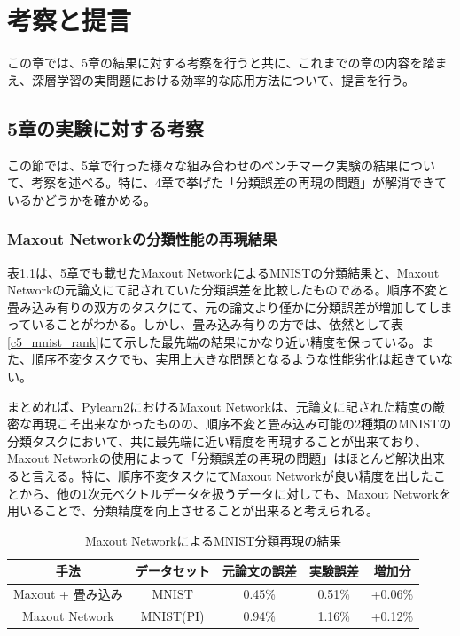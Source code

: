 \chapter{考察と提言}
この章では、5章の結果に対する考察を行うと共に、これまでの章の内容を踏まえ、深層学習の実問題における効率的な応用方法について、提言を行う。

\section{5章の実験に対する考察}
この節では、5章で行った様々な組み合わせのベンチマーク実験の結果について、考察を述べる。特に、4章で挙げた「分類誤差の再現の問題」が解消できているかどうかを確かめる。

\subsection{Maxout Networkの分類性能の再現結果}
表\ref{c6_maxout_mnist_result}は、5章でも載せたMaxout NetworkによるMNISTの分類結果と、Maxout Networkの元論文にて記されていた分類誤差を比較したものである。順序不変と畳み込み有りの双方のタスクにて、元の論文より僅かに分類誤差が増加してしまっていることがわかる。しかし、畳み込み有りの方では、依然として表\ref{c5_mnist_rank}にて示した最先端の結果にかなり近い精度を保っている。また、順序不変タスクでも、実用上大きな問題となるような性能劣化は起きていない。\par
まとめれば、Pylearn2におけるMaxout Networkは、元論文に記された精度の厳密な再現こそ出来なかったものの、順序不変と畳み込み可能の2種類のMNISTの分類タスクにおいて、共に最先端に近い精度を再現することが出来ており、Maxout Networkの使用によって「分類誤差の再現の問題」はほとんど解決出来ると言える。特に、順序不変タスクにてMaxout Networkが良い精度を出したことから、他の1次元ベクトルデータを扱うデータに対しても、Maxout Networkを用いることで、分類精度を向上させることが出来ると考えられる。
\begin{table}[tdp]
\caption{Maxout NetworkによるMNIST分類再現の結果}
\centering
\begin{tabular}{|c|c|c|c|c|}\hline
手法 & データセット & 元論文の誤差 & 実験誤差 & 増加分\\ \hline
Maxout + 畳み込み & MNIST & 0.45\% & 0.51\% & +0.06\% \\ \hline
Maxout Network & MNIST(PI) & 0.94\% & 1.16\% & +0.12\% \\ \hline
\end{tabular}
\label{c6_maxout_mnist_result}
\end{table}

